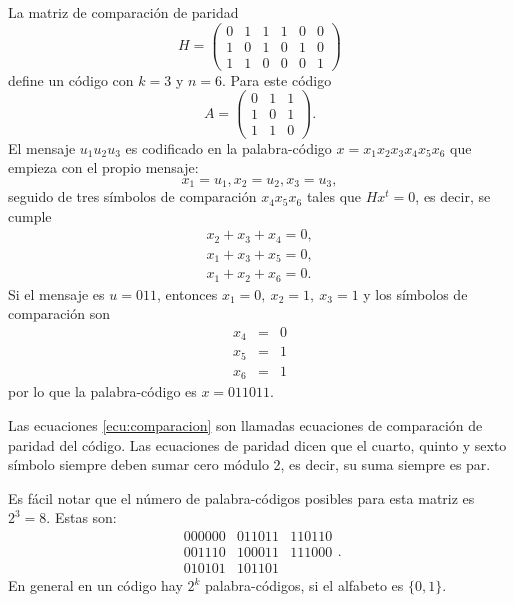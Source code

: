 \begin{ejemplo}
La matriz de comparación de paridad 
\[ H = \left(\begin{array}{ccc|ccc}
0 & 1 & 1 & 1 & 0 & 0 \\
1 & 0 & 1 & 0 & 1 & 0 \\
1 & 1 & 0 & 0 & 0 & 1
\end{array}\right) \] define un código con $k=3$ y $n=6$. Para este código 
\[ A = \begin{pmatrix}
0 & 1 & 1\\
1 & 0 & 1 \\
1 & 1 & 0
\end{pmatrix}.  \]
El mensaje $u_1u_2u_3$ es codificado en la palabra-código $x = x_1x_2x_3x_4x_5x_6$ que empieza con el propio mensaje:
\[ x_1 = u_1, x_2 = u_2, x_3 = u_3, \] seguido de tres símbolos de comparación $x_4x_5x_6$ tales que $Hx^t = 0$, es decir, se cumple
\begin{eqnarray}\label{ecu:comparacion}
x_2 + x_3 + x_4 = 0, \\
x_1 + x_3 + x_5 = 0, \\
x_1 + x_2 + x_6 = 0.
\end{eqnarray}
Si el mensaje es $u = 011$, entonces $x_1= 0,\  x_2 = 1, \ x_3 =1$ y los símbolos de comparación son
\begin{eqnarray*}
x_4 & = & 0 \\
x_5 &=& 1 \\
x_6 &=& 1
\end{eqnarray*}
por lo que la palabra-código es $x = 011011$.
\end{ejemplo}
Las ecuaciones \ref{ecu:comparacion} son llamadas ecuaciones de comparación de paridad del código. Las ecuaciones de paridad dicen que el cuarto, quinto y sexto símbolo siempre deben sumar cero módulo 2, es decir, su suma siempre es par. 

Es fácil notar que el número de palabra-códigos posibles para esta matriz es $2^3 = 8$. Estas son:
\[ \begin{array}{ccc}
000000 & 011011 & 110110 \\
001110 & 100011 & 111000 \\
010101 & 101101 & 
\end{array}. \]
En general en un código hay $2^k$ palabra-códigos, si el alfabeto es $\{0,1\}$.

